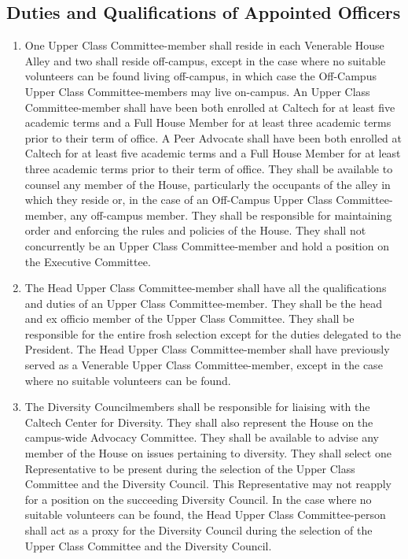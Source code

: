 \documentclass[10pt]{article} %
\begin{document}
\subsection{Duties and Qualifications of Appointed Officers}
\label{AppointedDuties}
\begin{enumerate}
\item One Upper Class Committee-member shall reside in each Venerable House Alley and two shall reside off-campus, except in the case where no suitable volunteers can be found living off-campus, in which case the Off-Campus Upper Class Committee-members may live on-campus. An Upper Class Committee-member shall have been both enrolled at Caltech for at least five academic terms and a Full House Member for at least three academic terms prior to their term of office. A Peer Advocate shall have been both enrolled at Caltech for at least five academic terms and a Full House Member for at least three academic terms prior to their term of office. They shall be available to counsel any member of the House, particularly the occupants of the alley in which they reside or, in the case of an Off-Campus Upper Class Committee-member, any off-campus member. They shall be responsible for maintaining order and enforcing the rules and policies of the House. They shall not concurrently be an Upper Class Committee-member and hold a position on the Executive Committee.
\item The Head Upper Class Committee-member shall have all the qualifications and duties of an Upper Class Committee-member. They shall be the head and ex officio member of the Upper Class Committee. They shall be responsible for the entire frosh selection except for the duties delegated to the President. The Head Upper Class Committee-member shall have previously served as a Venerable Upper Class Committee-member, except in the case where no suitable volunteers can be found.
\item The Diversity Councilmembers shall be responsible for liaising with the Caltech Center for Diversity. They shall also represent the House on the campus-wide Advocacy Committee. They shall be available to advise any member of the House on issues pertaining to diversity. They shall select one Representative to be present during the selection of the Upper Class Committee and the Diversity Council. This Representative may not reapply for a position on the succeeding Diversity Council. In the case where no suitable volunteers can be found, the Head Upper Class Committee-person shall act as a proxy for the Diversity Council during the selection of the Upper Class Committee and the Diversity Council.

\end{enumerate}
\end{document}
